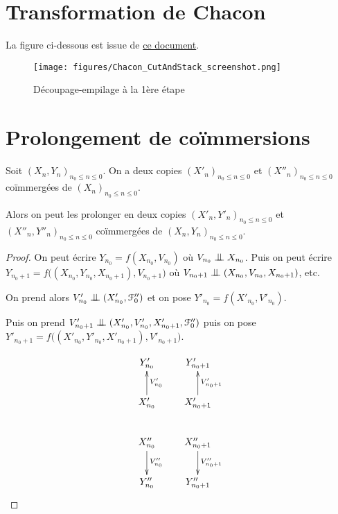 \documentclass[12pt,a4paper]{article}
\begin{document}
\newpage 
\begin{appendices}

\section{Transformation de Chacon}\label{app:transfoChacon}

La figure ci-dessous est issue de \href{https://cdr.lib.unc.edu/indexablecontent/uuid:bfc41b0c-b048-440f-9a57-533e02ea4f76}{ce document}.  

\begin{figure}[!h]
\texttt{[image: figures/Chacon\_CutAndStack\_screenshot.png]} 
\caption{Découpage-empilage à la 1ère étape}
\end{figure}

\section{Prolongement de co\"immersions}

\begin{lemme}\label{lemme:coimmersion}
Soit ${(X_n, Y_n)}_{n_0 \leq n \leq 0}$. 
On a deux copies ${(X'_n)}_{n_0 \leq n \leq 0}$ et ${(X''_n)}_{n_0 \leq n \leq 0}$ 
coïmmergées de ${(X_n)}_{n_0 \leq n \leq 0}$. 

Alors on peut les prolonger en deux copies  ${(X'_n, Y'_n)}_{n_0 \leq n \leq 0}$ et 
${(X''_n, Y''_n)}_{n_0 \leq n \leq 0}$ 
coïmmergées de ${(X_n, Y_n)}_{n_0 \leq n \leq 0}$. 
\end{lemme}

\begin{proof}
On peut écrire $Y_{n_0} = f(X_{n_0}, V_{n_0})$ où $V_{n_0} \indep X_{n_0}$. 
Puis on peut écrire $Y_{n_0+1} = f\bigl((X_{n_0}, Y_{n_0}, X_{n_0+1}), V_{n_0+1}\bigr)$ où 
$V_{n_0+1} \indep (X_{n_0}, V_{n_0}, X_{n_0+1})$, etc. 

On prend alors $V'_{n_0} \indep (X'_{n_0}, \FF''_0)$ et on pose 
 $Y'_{n_0} = f(X'_{n_0}, V'_{n_0})$. 
 
 Puis on prend $V'_{n_0+1} \indep (X'_{n_0}, V'_{n_0}, X'_{n_0+1}, \FF''_0)$ 
 puis on pose $Y'_{n_0+1} = f\bigl((X'_{n_0}, Y'_{n_0}, X'_{n_0+1}), V'_{n_0+1}\bigr)$. 


\begin{displaymath}
\xymatrix{
Y'_{n_0} & Y'_{n_0+1} \\
X'_{n_0} \ar[u]_{V'_{n_0}} & X'_{n_0+1} \ar[u]_{V'_{n_0+1}}  \\
X''_{n_0} \ar[d]^{V''_{n_0}} & X''_{n_0+1} \ar[d]^{V''_{n_0+1}} \\
Y''_{n_0} & Y''_{n_0+1}
}
\end{displaymath}


\end{proof}
\end{appendices}
\end{document}
